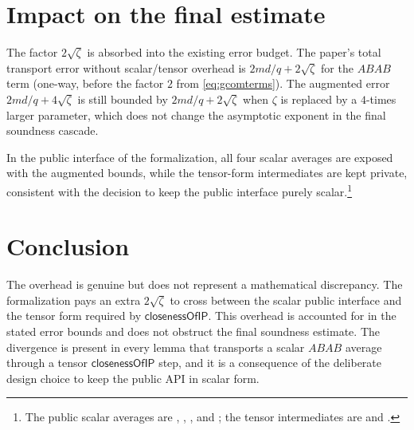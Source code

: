 \documentclass{article}
\newcommand{\ABAB}{\textit{ABAB}}
\newcommand{\closenessOfIP}{\textsf{closenessOfIP}}
\begin{document}
\section{Impact on the final estimate}

The factor $2\sqrt{\zeta}$ is absorbed into the existing error
budget. The paper's total transport error without scalar/tensor
overhead is $2md/q + 2\sqrt{\zeta}$ for the $\ABAB$ term (one-way,
before the factor $2$ from \eqref{eq:gcomterms}). The augmented
error $2md/q + 4\sqrt{\zeta}$ is still bounded by
$2md/q + 2\sqrt{\zeta}$ when $\zeta$ is replaced by a $4$-times
larger parameter, which does not change the asymptotic exponent in
the final soundness cascade.

In the public interface of the formalization, all four scalar
averages are exposed with the augmented bounds, while the
tensor-form intermediates are kept private, consistent with the
decision to keep the public interface purely scalar.\footnote{The
public scalar averages are ,
, , and
; the tensor intermediates are
 and
.}

\section{Conclusion}

The overhead is genuine but does not represent a mathematical
discrepancy. The formalization pays an extra $2\sqrt{\zeta}$ to
cross between the scalar public interface and the tensor form
required by $\closenessOfIP$. This overhead is accounted for in the
stated error bounds and does not obstruct the final soundness
estimate. The divergence is present in every lemma that transports
a scalar $\ABAB$ average through a tensor $\closenessOfIP$ step, and
it is a consequence of the deliberate design choice to keep the
public API in scalar form.



\end{document}
